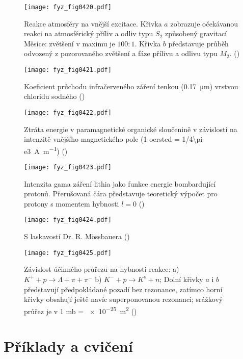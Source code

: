     \begin{figure}[ht!] %
      \centering
      \texttt{[image: fyz\_fig0420.pdf]}
      \caption{Reakce atmosféry na vnější excitace. Křivka \(a\) zobrazuje očekávanou reakci na
              atmosférický příliv a odliv typu \(S_2\) způsobený gravitací Měsíce: zvětšení v maximu
              je \(100:1\). Křivka \(b\) představuje průběh odvozený z pozorovaného zvětšení a fáze
              přílivu a odlivu typu \(M_2\). (\cite[s.~318]{Feynman01})}
      \label{fyz:fig0420}
    \end{figure}

    \begin{figure}[ht!] %
      \centering
      \texttt{[image: fyz\_fig0421.pdf]}
      \caption{Koeficient průchodu infračerveného záření tenkou (\SI{0.17}{\micro\m}) vrstvou 
               chloridu sodného
               (\cite[s.~319]{Feynman01})}
      \label{fyz:fig0421}
    \end{figure}
  
    \begin{figure}[ht!] %
      \centering
      \texttt{[image: fyz\_fig0422.pdf]}
      \caption{Ztráta energie v paramagnetické organické sloučenině v závislosti na intenzitě 
      vnějšího magnetického pole (1 oersted = \SI{1/4\pi e3}{\ampere\per\meter})
               (\cite[s.~320]{Feynman01})}
      \label{fyz:fig0422}
    \end{figure}
  
    \begin{figure}[ht!] %
      \centering
      \texttt{[image: fyz\_fig0423.pdf]}
      \caption{Intenzita gama záření lithia jako funkce energie bombardující protonů. Přerušovaná 
               čára představuje teoretický výpočet pro protony s momentem hybnosti \(l=0\)
               (\cite[s.~320]{Feynman01})}
      \label{fyz:fig0423}
    \end{figure}
  
    \begin{figure}[ht!] %
      \centering
      \texttt{[image: fyz\_fig0424.pdf]}
      \caption{S laskavostí Dr. R. M\"{o}ssbauera
               (\cite[s.~321]{Feynman01})}
      \label{fyz:fig0424}
    \end{figure}
  
    \begin{figure}[ht!] %
      \centering
      \texttt{[image: fyz\_fig0425.pdf]}
      \caption{Závislost účinného průřezu na hybnosti reakce: a) \(K^+ + p \rightarrow \Lambda + \pi 
              + \pi^-\) b) \(K^- + p \rightarrow K^o + n\); Dolní křivky \(a\) i \(b\) představují
              předpokládané pozadí bez rezonance, zatímco horní křivky obsahují ještě navíc
              superponovanou rezonanci; srážkový průřez je v 1 mb = \SI{e-25}{\m\squared}
               (\cite[s.~321]{Feynman01})}
      \label{fyz:fig0425}
    \end{figure}

  \section{Příklady a cvičení}\label{fyz:IchapXXIIIsecV}
